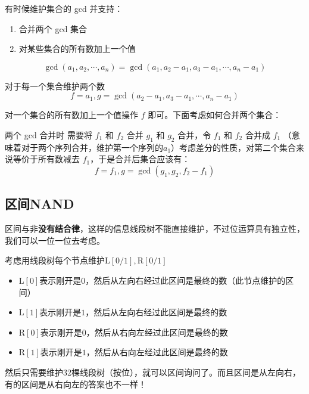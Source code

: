 有时候维护集合的 gcd 并支持：
\begin{enumerate}
\item 合并两个 gcd 集合
\item 对某些集合的所有数加上一个值
\end{enumerate}
$$
\operatorname{gcd}\left(a_1, a_2, \cdots, a_n\right)=\operatorname{gcd}\left(a_1, a_2-a_1, a_3-a_1, \cdots, a_n-a_{1}\right)
$$

\par \noindent 对于每一个集合维护两个数 
$$
f = a_1,g = \gcd(a_2-a_1, a_3-a_1, \cdots, a_n-a_{1})
$$
\par \noindent 对一个集合的所有数加上一个值操作 $f$ 即可。下面考虑如何合并两个集合：
~\\
\par \noindent 两个 gcd 合并时 需要将 $f_1$ 和 $f_2$ 合并 $g_1$ 和 $g_2$ 合并，令 $f_1$ 和 $f_2$ 合并成 $f_1$ （意味着对于两个序列合并，维护第一个序列的$a_1$）考虑差分的性质，对第二个集合来说等价于所有数减去 $f_1$，于是合并后集合应该有：
$$
f = f_1, g = \gcd(g_1, g_2,f_2 -f_1)
$$
\subsection{区间NAND}

\par \noindent 区间与非\textbf{没有结合律}，这样的信息线段树不能直接维护，不过位运算具有独立性，我们可以一位一位去考虑。
~\\
\par \noindent 考虑用线段树每个节点维护$\text{L}[0/1],\text{R}[0/1]$
\begin{itemize}
\item $\text{L}[0]$表示刚开是$0$，然后从左向右经过此区间是最终的数（此节点维护的区间）
\item $\text{L}[1]$表示刚开是$1$，然后从左向右经过此区间是最终的数
\item $\text{R}[0]$表示刚开是$0$，然后从右向左经过此区间是最终的数
\item $\text{R}[1]$表示刚开是$1$，然后从右向左经过此区间是最终的数
\end{itemize}
\par \noindent 然后只需要维护32棵线段树（按位），就可以区间询问了。而且区间是从左向右，有的区间是从右向左的答案也不一样！

